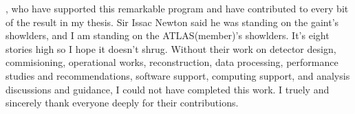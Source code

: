 


, who have supported this remarkable program and have contributed to every bit of the result in my thesis. Sir Issac Newton said he was standing on the gaint's showlders, and I am standing on the ATLAS(member)'s showlders. It's eight stories high so I hope it doesn't shrug. Without their work on detector design, commisioning, operational works, reconstruction, data processing, performance studies and recommendations, software support, computing support, and analysis discussions and guidance, I could not have completed this work. I truely and sincerely thank everyone deeply for their contributions.


